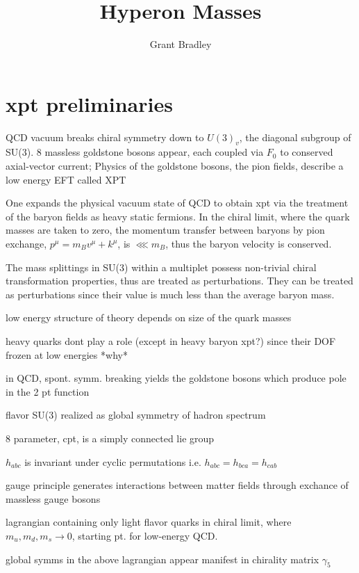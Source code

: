 \documentclass[12pt,tightenlines, raggedbottom, prd, notitlepage]{revtex4-1}
\begin{document}
\title{Hyperon Masses}
\author{Grant Bradley}
\maketitle

\section*{xpt preliminaries}

QCD vacuum breaks chiral symmetry down to $U(3)_v$, the diagonal subgroup of SU(3).
8 massless goldstone bosons appear, each coupled via $F_0$ to conserved axial-vector current; 
Physics of the goldstone bosons, the pion fields, describe a low energy EFT called XPT 
  
One expands the physical vacuum state of QCD to obtain xpt via the treatment of the baryon fields as heavy static fermions.
In the chiral limit, where the quark masses are taken to zero, the momentum transfer between baryons by pion exchange, $p^\mu = m_Bv^\mu + k^\mu$,
is $\lll m_B$, thus the baryon velocity is conserved.

The mass splittings in SU(3) within a multiplet possess non-trivial chiral transformation properties, thus are treated as perturbations.
They can be treated as perturbations since their value is much less than the average baryon mass.





low energy structure of theory depends on size of the quark masses

heavy quarks dont play a role (except in heavy baryon xpt?) since their DOF frozen at low energies *why*

in QCD, spont. symm. breaking yields the goldstone bosons which produce pole in the 2 pt function 

flavor SU(3) realized as global symmetry of hadron spectrum 

8 parameter, cpt, is a simply connected lie group 

$h_{abc}$ is invariant under cyclic permutations i.e. $h_{abc} = h_{bca} = h_{cab}$

gauge principle generates interactions between matter fields through exchance of massless gauge bosons 

lagrangian containing only light flavor quarks in chiral limit, where $m_u, m_d, m_s \rightarrow 0$, starting pt. for low-energy QCD. 

global symms in the above lagrangian appear manifest in chirality matrix $\gamma_5$
\end{document}

